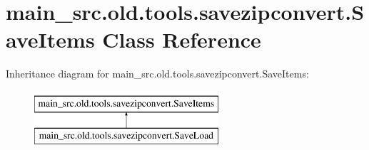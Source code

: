 \hypertarget{classmain__src_8old_1_1tools_1_1savezipconvert_1_1SaveItems}{\section{main\-\_\-src.\-old.\-tools.\-savezipconvert.\-Save\-Items Class Reference}
\label{classmain__src_8old_1_1tools_1_1savezipconvert_1_1SaveItems}
}
Inheritance diagram for main\-\_\-src.\-old.\-tools.\-savezipconvert.\-Save\-Items\-:\begin{figure}[H]
\begin{center}
\leavevmode
\includegraphics[height=2.000000cm]{classmain__src_8old_1_1tools_1_1savezipconvert_1_1SaveItems}
\end{center}
\end{figure}
